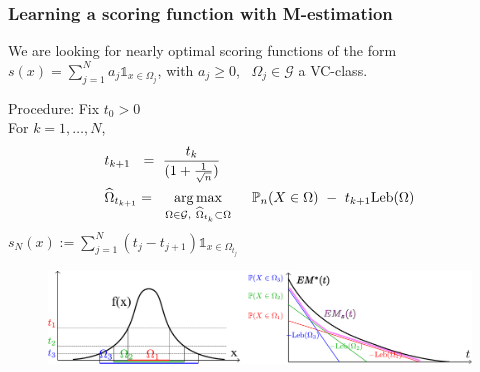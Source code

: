 \documentclass[9pt]{beamer}
\newcommand\blue{\color{blue} }
\def\argmax{\operatornamewithlimits{arg\,max}}
\def\leb{\text{Leb}}
\begin{document}
\begin{frame}
\frametitle{Learning a scoring function with M-estimation}



We are looking for nearly optimal scoring functions of the form {\blue $s(x) = \sum_{j=1}^N a_j \mathds{1}_{x \in \Omega_j}$}, with $a_j \ge 0$,~ $\Omega_j \in \mathcal{G}$ a VC-class.\\


\begin{block}{}
{\blue Procedure}:  Fix $t_0 > 0$\\
For $k=1, \ldots, N$,
%
\begin{align*}
&t_{k+1} ~~=~ \frac{t_k}{(1 + \frac{1}{\sqrt n})}\\
&\widehat \Omega_{t_{k+1}} =~~ \argmax_{\Omega \in \mathcal{G},~ \widehat \Omega_{t_k} \subset \Omega } ~~~~ \mathbb{P}_n(X \in \Omega) ~-~ t_{k+1} \leb(\Omega)
\end{align*}
%
$s_N(x) := \sum_{j=1}^N(t_j - t_{j+1}) \mathds{1}_{x \in \Omega_{t_j}}$
\begin{figure}
\includegraphics[width=\linewidth]{sourcefigs/em_optim.pdf}
\end{figure}
\end{block}

\end{frame}
\end{document}
